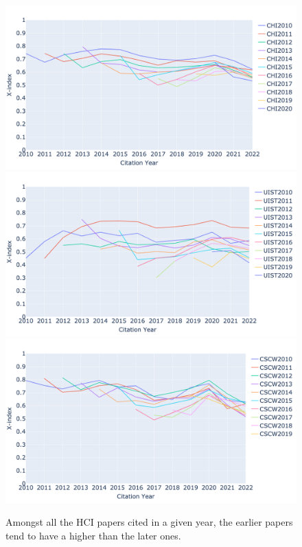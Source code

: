 \begin{figure}[t]
    \centering
    \includegraphics[width=\columnwidth]{figures/fig3_CHI.png}
    \includegraphics[width=\columnwidth]{figures/fig3_UIST.png}
    \includegraphics[width=\columnwidth]{figures/fig3_CSCW.png}
    \caption{Amongst all the HCI papers cited in a given year, the earlier papers tend to have a higher \xin than the later ones.}
    \label{fg:fig3}
\end{figure}

